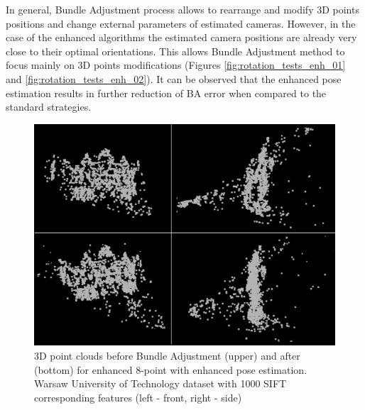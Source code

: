 In general, Bundle Adjustment process allows to rearrange and modify 3D points positions and change external parameters of estimated cameras. However, in the case of the enhanced algorithms the estimated camera positions are already very close to their optimal orientations. This allows Bundle Adjustment method to focus mainly on 3D points modifications (Figures \ref{fig:rotation_tests_enh_01} and \ref{fig:rotation_tests_enh_02}). It can be observed that the enhanced pose estimation results in further reduction of BA error when compared to the standard strategies.
\begin{figure}[h!]
    \centering
    \includegraphics[width=\textwidth]{bundleAdjustmentComparison}
    \caption[3D point clouds before and after Bundle Adjustment for enhanced 8-point with enhanced pose estimation]{3D point clouds before Bundle Adjustment (upper) and after (bottom) for enhanced 8-point with enhanced pose estimation. Warsaw University of Technology dataset with 1000 SIFT corresponding features (left - front, right - side)}
    \label{fig:BundleAdjustmentComparison}
\end{figure}


